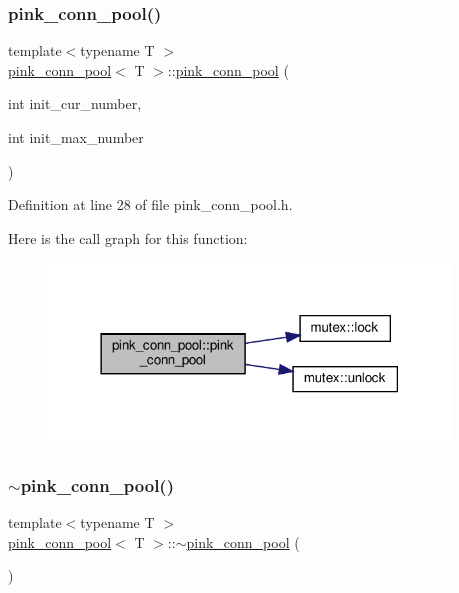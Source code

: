 \subsubsection{\texorpdfstring{pink\+\_\+conn\+\_\+pool()}{pink\_conn\_pool()}}
{\footnotesize\ttfamily template$<$typename T $>$ \\
\hyperlink{classpink__conn__pool}{pink\+\_\+conn\+\_\+pool}$<$ T $>$\+::\hyperlink{classpink__conn__pool}{pink\+\_\+conn\+\_\+pool} (\begin{DoxyParamCaption}\item[{int}]{init\+\_\+cur\+\_\+number,  }\item[{int}]{init\+\_\+max\+\_\+number }\end{DoxyParamCaption})}



Definition at line 28 of file pink\+\_\+conn\+\_\+pool.\+h.

Here is the call graph for this function\+:
\nopagebreak
\begin{figure}[H]
\begin{center}
\leavevmode
\includegraphics[width=302pt]{classpink__conn__pool_a5c557c48815d595f7897f6abc8e55758_cgraph}
\end{center}
\end{figure}
\mbox{\label{classpink__conn__pool_a292bf2f0711edeee62ee787eb72b9311}} 
\subsubsection{\texorpdfstring{$\sim$pink\+\_\+conn\+\_\+pool()}{~pink\_conn\_pool()}}
{\footnotesize\ttfamily template$<$typename T $>$ \\
\hyperlink{classpink__conn__pool}{pink\+\_\+conn\+\_\+pool}$<$ T $>$\+::$\sim$\hyperlink{classpink__conn__pool}{pink\+\_\+conn\+\_\+pool} (\begin{DoxyParamCaption}{ }\end{DoxyParamCaption})}



